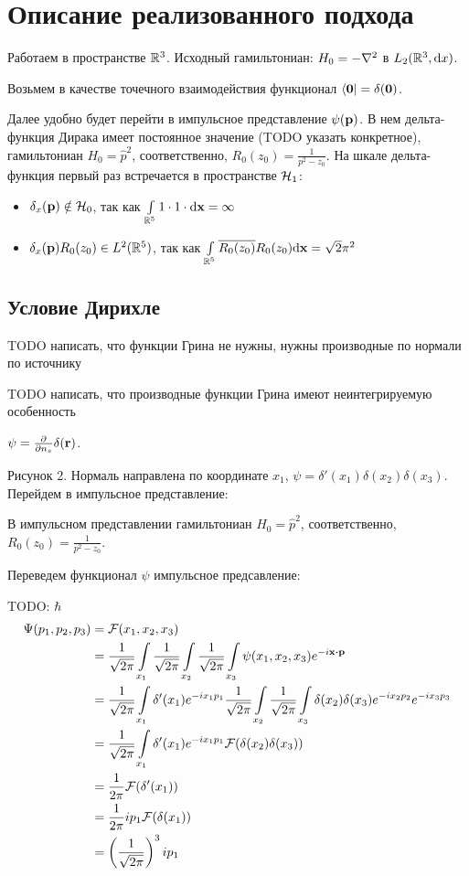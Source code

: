 \chapter{Описание реализованного подхода}
\label{chapter2}

Работаем в пространстве $\mathbb{R}^3$. Исходный гамильтониан: $H_0 = -\laplacian$ в $L_2(\mathbb{R}^3, \dd x)$.

Возьмем в качестве точечного взаимодействия функционал $\bra{\vb{0}} = \delta(\vb{0})$.

Далее удобно будет перейти в импульсное представление $\psi(\vb{p})$. В нем дельта-функция Дирака имеет постоянное значение (TODO указать конкретное), гамильтониан $H_0 = \hat{p}^2$, соответственно, $R_0(z_0) = \frac{1}{p^2 - z_0}$. На шкале дельта-функция первый раз встречается в пространстве $\mathcal{H}_{1}$:

\begin{itemize}
\item $\delta_x(\vb{p}) \notin \mathcal{H}_{0}$, так как $\int\limits_{\mathbb{R}^5} 1 \cdot 1 \cdot \dd \vb{x} = \infty$
\item $\delta_x(\vb{p}) R_0(z_0) \in L^2(\mathbb{R}^5)$, так как $\int\limits_{\mathbb{R}^5} \overline{R_0(z_0)} R_0(z_0) \dd \vb{x} = \sqrt{2} \pi^2$
\end{itemize}


\section{Условие Дирихле}
TODO написать, что функции Грина не нужны, нужны производные по нормали по источнику

TODO написать, что производные функции Грина имеют неинтегрируемую особенность

$\psi = \pdv{n_s} \delta(\vb{r})$.

Рисунок 2. Нормаль направлена по координате $x_1$, $\psi = \delta'(x_1) \delta(x_2) \delta(x_3)$. Перейдем в импульсное представление:

В импульсном представлении гамильтониан $H_0 = \hat{p}^2$, соответственно, $R_0(z_0) = \frac{1}{p^2 - z_0}$.

Переведем функционал $\psi$ импульсное предсавление:

TODO: $\hbar$
\begin{align*}
\Psi(p_1, p_2, p_3)
&= \mathcal{F}(x_1, x_2, x_3) \\
&= \frac{1}{\sqrt{2 \pi}} \int\limits_{x_1} \frac{1}{\sqrt{2 \pi}} \int\limits_{x_2} \frac{1}{\sqrt{2 \pi}} \int\limits_{x_3} \psi(x_1, x_2, x_3) e^{-i \vb{x} \vdot \vb{p}} \\
&= \frac{1}{\sqrt{2 \pi}} \int\limits_{x_1} \delta'(x_1) e^{-i x_1 p_1} \frac{1}{\sqrt{2 \pi}} \int\limits_{x_2} \frac{1}{\sqrt{2 \pi}} \int\limits_{x_3} \delta(x_2) \delta(x_3) e^{-i x_2 p_2} e^{-i x_3 p_3} \\
&= \frac{1}{\sqrt{2 \pi}} \int\limits_{x_1} \delta'(x_1) e^{-i x_1 p_1} \mathcal{F}(\delta(x_2) \delta(x_3)) \\
&= \frac{1}{2 \pi} \mathcal{F}(\delta'(x_1)) \\
&= \frac{1}{2 \pi} i p_1 \mathcal{F}(\delta(x_1)) \\
&= \left(\frac{1}{\sqrt{2 \pi}}\right)^3 i p_1
\end{align*}


